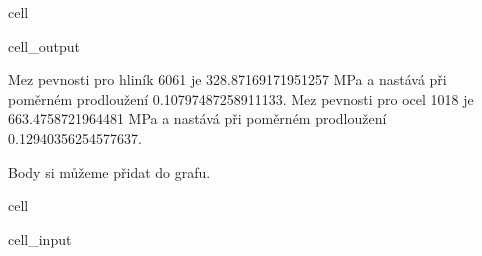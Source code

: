 \documentclass[letterpaper,10pt,english]{jupyterBook}
\begin{document}
{{\begin{sphinxuseclass}{cell}
\begin{sphinxVerbatimOutput}
\begin{sphinxuseclass}{cell_output}
\begin{sphinxVerbatim}[commandchars=\\\{\}]
Mez pevnosti pro hliník 6061 je 328.87169171951257 MPa a nastává při poměrném prodloužení 0.10797487258911133.
Mez pevnosti pro ocel 1018 je 663.4758721964481 MPa a nastává při poměrném prodloužení 0.12940356254577637.
\end{sphinxVerbatim}

\end{sphinxuseclass}\end{sphinxVerbatimOutput}

\end{sphinxuseclass}
\sphinxAtStartPar
Body si můžeme přidat do grafu.

\begin{sphinxuseclass}{cell}\begin{sphinxVerbatimInput}

\begin{sphinxuseclass}{cell_input}
\begin{sphinxVerbatim}[commandchars=\\\{\}]
  

    
    

     
     



\end{sphinxVerbatim}
\end{sphinxuseclass}
\end{sphinxVerbatimInput}
\end{sphinxuseclass}}}
\end{document}
